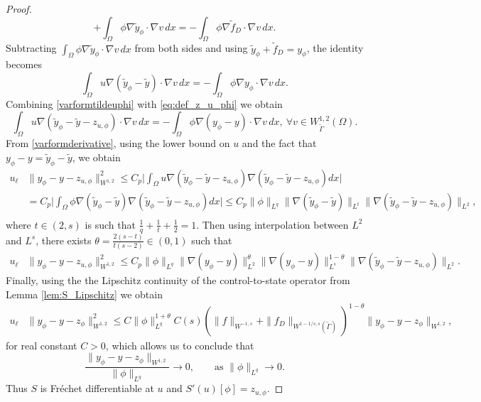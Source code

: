 \documentclass[11pt]{article}
\theoremstyle{definition}
\theoremstyle{remark}
\begin{document}
\begin{proof}
\[+
\int_\Omega \phi \nabla \tilde y_{\phi} \cdot \nabla v \, dx
=
-  \int_\Omega \phi \nabla \tilde f_D \cdot \nabla v \, dx.
\]
%
Subtracting $\int_\Omega \phi \nabla \tilde y_{\phi} \cdot \nabla v \, dx$ from both sides and 
using $\tilde y_{\phi} + \tilde f_D = y_{\phi}$, the identity becomes
%
\begin{equation}\label{varformtildeuphi}
\int_\Omega u \nabla(\tilde{y}_{\phi} - \tilde{y}) \cdot \nabla v \, dx
=
-  \int_\Omega \phi \nabla y_{\phi} \cdot \nabla v \, dx.
\end{equation}
Combining \eqref{varformtildeuphi} with \eqref{eq:def_z_u_phi} we obtain 
\begin{equation}\label{varformderivative}
\int_\Omega u \nabla(\tilde{y}_{\phi} - \tilde{y} - z_{u, \phi}) \cdot \nabla v \, dx
=
-  \int_\Omega \phi \nabla (y_{\phi} -  y) \cdot \nabla v \, dx, \ \forall v \in W^{1,2}_{\tilde \Gamma}(\Omega).
\end{equation}
From \eqref{varformderivative}, using the lower bound on $u$ and the fact that $
y_\phi-y=\tilde y_\phi-\tilde y$, we obtain 
\begin{align}
u_{\ell} &  \|y_{\phi} - y - z_{u, \phi}\|^2_{W^{1,2}}
\leq  C_p \Big | \int_{\Omega} u  \nabla ( \tilde{y}_{\phi} - \tilde{y} -  z_{u, \phi} ) \nabla ( \tilde{y}_{\phi} - \tilde{y} -  z_{u, \phi} ) dx \Big | \nonumber \\
&= C_p \Big | \int_{\Omega} \phi   \nabla ( \tilde{y}_{\phi} - \tilde{y}  ) \nabla ( \tilde{y}_{\phi} - \tilde{y} - z_{u, \phi} ) dx \Big |  \leq C_p\| \phi\|_{L^q}
\|  \nabla ( \tilde{y}_{\phi} - \tilde{y}  )\|_{L^{t}}
\| \nabla ( \tilde{y}_{\phi} - \tilde{y} -  z_{u, \phi} )\|_{L^{2}}, \nonumber \\
\end{align}
where $t \in (2,s)$ is such that 
$
\frac1q+\frac1t+\frac12=1$. Then using interpolation between $L^2$ and $L^s$, there exists
$\theta=\frac{2(s-t)}{t(s-2)} \in(0,1)$ such that 
\begin{align}
u_{\ell} &  \|y_{\phi} - y -  z_{u, \phi}\|^2_{W^{1,2}}
\le C_p\|\phi\|_{L^q}
\|\nabla(y_{\phi} - y)\|_{L^2}^{\theta}
\|\nabla(y_{\phi} - y)\|_{L^s}^{1-\theta}
\| \nabla ( \tilde{y}_{\phi} - \tilde{y} -  z_{u, \phi} )\|_{L^{2}}.
\end{align}
Finally, using the the Lipschitz continuity of the control-to-state operator
from Lemma \ref{lem:S_Lipschitz} we obtain
\begin{align}
u_{\ell} &  \|y_{\phi} - y - z_{\phi}\|^2_{W^{1,2}}
\leq C \| \phi\|_{L^q}^{1+\theta}
C(s)(\|f\|_{W^{-1,s}} + \|f_D\|_{W^{1-1/s,s}(\tilde{\Gamma})})^{1 - \theta}
\|y_{\phi} - y - z_{\phi}\|_{W^{1,2}},\nonumber
\end{align}
for real constant $C>0$, which allows us to conclude that
\[
\frac{
\|y_{\phi} - y - z_{\phi}\|_{W^{1,2}}
}{
\|\phi\|_{L^q}
}
\to 0,
\qquad
\text{as }
\|\phi\|_{L^q}\to 0.
\]
Thus $S$ is Fr\'echet differentiable at $u$ and 
$S'(u)[\phi]= z_{u, \phi}$. 

\end{proof}
\end{document}
